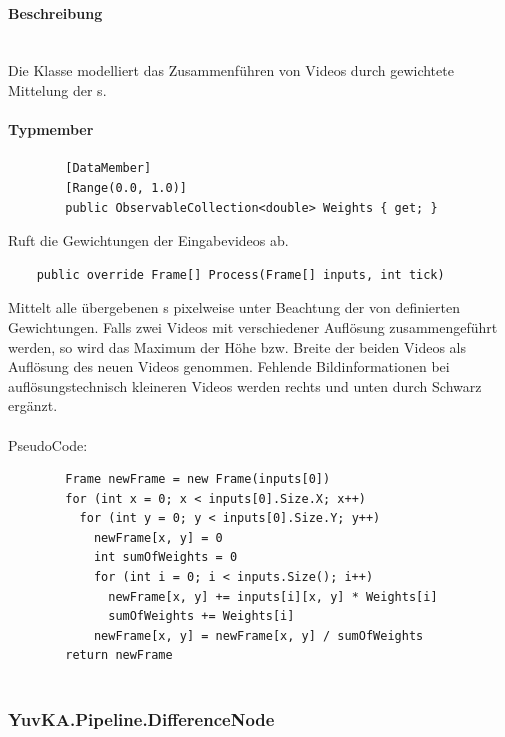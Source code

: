 \paragraph{Beschreibung}~\\
Die Klasse  modelliert das Zusammenführen von Videos durch gewichtete Mittelung der s.

\paragraph{Typmember}
\begin{itemize}

	\begin{verbatim}
		[DataMember]
		[Range(0.0, 1.0)]
		public ObservableCollection<double> Weights { get; }
	\end{verbatim}
	Ruft die Gewichtungen der Eingabevideos ab.

	\begin{verbatim}
	public override Frame[] Process(Frame[] inputs, int tick)
	\end{verbatim}
	Mittelt alle übergebenen s pixelweise unter Beachtung der von  definierten Gewichtungen. Falls zwei Videos mit verschiedener Auflösung zusammengeführt werden, so wird das Maximum der Höhe bzw. Breite der beiden Videos als Auflösung des neuen Videos genommen. Fehlende Bildinformationen bei auflösungstechnisch kleineren Videos werden rechts und unten durch Schwarz ergänzt.\\~\\
	PseudoCode:
	\begin{verbatim}
		Frame newFrame = new Frame(inputs[0])
		for (int x = 0; x < inputs[0].Size.X; x++)
		  for (int y = 0; y < inputs[0].Size.Y; y++)
		    newFrame[x, y] = 0
		    int sumOfWeights = 0
		    for (int i = 0; i < inputs.Size(); i++)
		      newFrame[x, y] += inputs[i][x, y] * Weights[i]
		      sumOfWeights += Weights[i]
		    newFrame[x, y] = newFrame[x, y] / sumOfWeights
		return newFrame
		
	\end{verbatim}
	
\end{itemize}

\subsubsection{YuvKA.Pipeline.DifferenceNode}

